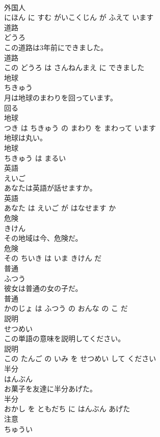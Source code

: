 \documentclass[8pt]{extreport}
\begin{document}
\begin{CJK}{UTF8}{min}
\\	外国人 
\\	にほん に すむ がいこくじん が ふえて います			
\\	道路	
\\	どうろ			
\\	この道路は3年前にできました。	
\\	道路 
\\	この どうろ は さんねんまえ に できました			
\\	地球	
\\	ちきゅう			
\\	月は地球のまわりを回っています。	
\\	回る 
\\	地球 
\\	つき は ちきゅう の まわり を まわって います			
\\	地球は丸い。	
\\	地球 
\\	ちきゅう は まるい			
\\	英語	
\\	えいご			
\\	あなたは英語が話せますか。	
\\	英語 
\\	あなた は えいご が はなせます か			
\\	危険	
\\	きけん			
\\	その地域は今、危険だ。	
\\	危険 
\\	その ちいき は いま きけん だ			
\\	普通	
\\	ふつう			
\\	彼女は普通の女の子だ。	
\\	普通 
\\	かのじょ は ふつう の おんな の こ だ			
\\	説明	
\\	せつめい			
\\	この単語の意味を説明してください。	
\\	説明 
\\	この たんご の いみ を せつめい して ください			
\\	半分	
\\	はんぶん			
\\	お菓子を友達に半分あげた。	
\\	半分 
\\	おかし を ともだち に はんぶん あげた			
\\	注意	
\\	ちゅうい			

\end{CJK}
\end{document}
